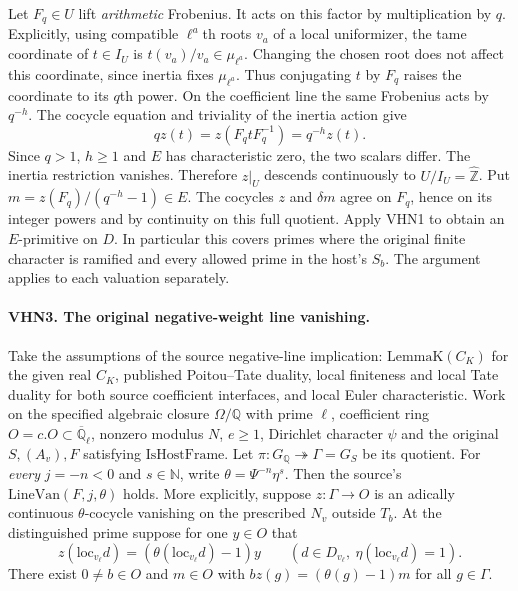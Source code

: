Let $F_q\in U$ lift \emph{arithmetic} Frobenius. It acts on this
factor by multiplication by $q$. Explicitly, using compatible
$\ell^a$th roots $v_a$ of a local uniformizer, the tame coordinate
of $t\in I_U$ is $t(v_a)/v_a\in\mu_{\ell^a}$.
Changing the chosen root does not affect this coordinate, since
inertia fixes $\mu_{\ell^a}$. Thus conjugating $t$ by $F_q$
raises the coordinate to its $q$th power. On the coefficient
line the same Frobenius acts by $q^{-h}$. The cocycle equation
and triviality of the inertia action give
\[
     q z(t)=z(F_q tF_q^{-1})=q^{-h}z(t).
\]
Since $q>1$, $h\ge1$ and $E$ has characteristic zero, the two
scalars differ. The inertia restriction vanishes. Therefore $z|_U$
descends continuously to $U/I_U=\widehat{\mathbb Z}$. Put
$m=z(F_q)/(q^{-h}-1)\in E$. The cocycles $z$ and $\delta m$
agree on $F_q$, hence on its integer powers and by continuity on
this full quotient. Apply VHN1 to obtain an $E$-primitive on $D$.
In particular this covers primes where the original finite
character is ramified and every allowed prime in the host's $S_b$.
The argument applies to each valuation separately.

\paragraph{VHN3. The original negative-weight line vanishing.}
\label{claim:VHN3}
Take the assumptions of the source negative-line implication:
$\mathrm{LemmaK}(C_K)$ for the given real $C_K$, published
Poitou--Tate duality, local finiteness and local Tate duality
for both source coefficient interfaces, and local Euler
characteristic. Work on the specified algebraic closure
$\Omega/\mathbb Q$ with prime $\ell$, coefficient ring
$O=c.O\subset\overline{\mathbb Q}_\ell$, nonzero modulus $N$,
$e\ge1$, Dirichlet character $\psi$ and the original
$S,(A_v),F$ satisfying $\mathrm{IsHostFrame}$. Let
$\pi:G_{\mathbb Q}\twoheadrightarrow\Gamma=G_S$ be its quotient.
For \emph{every} $j=-n<0$ and $s\in\mathbb N$, write
$\theta=\Psi^{-n}\eta^s$. Then the source's
$\mathrm{LineVan}(F,j,\theta)$ holds. More explicitly, suppose
$z:\Gamma\to O$ is an adically continuous $\theta$-cocycle
vanishing on the prescribed $N_v$ outside $T_b$. At the
distinguished prime suppose for one $y\in O$ that
\[
 z(\mathrm{loc}_{v_\ell}d)
  =(\theta(\mathrm{loc}_{v_\ell}d)-1)y
   \qquad(d\in D_{v_\ell},\ \eta(\mathrm{loc}_{v_\ell}d)=1).
\]
There exist $0\ne b\in O$ and $m\in O$ with
$b z(g)=(\theta(g)-1)m$ for all $g\in\Gamma$.

